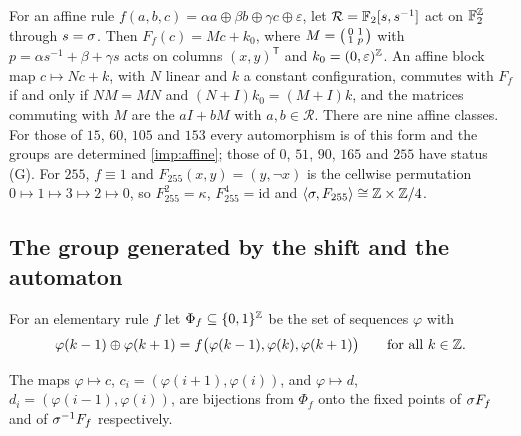 \begin{remark}\label{cl:rem:affine}
For an affine rule $f(a,b,c)=\alpha a\oplus\beta b\oplus\gamma c\oplus\varepsilon$, let $\mathcal R=\mathbb{F}_2[s,s^{-1}]$ act on $\mathbb{F}_2^{\mathbb{Z}}$ through $s=\sigma$. Then $F_f(c)=Mc+k_0$, where $M=\begin{psmallmatrix}0&1\\1&p\end{psmallmatrix}$ with $p=\alpha s^{-1}+\beta+\gamma s$ acts on columns $(x,y)^{\mathsf T}$ and $k_0=(0,\varepsilon)^{\mathbb{Z}}$. An affine block map $c\mapsto Nc+k$, with $N$ linear and $k$ a constant configuration, commutes with $F_f$ if and only if $NM=MN$ and $(N+I)k_0=(M+I)k$, and the matrices commuting with $M$ are the $aI+bM$ with $a,b\in\mathcal R$. There are nine affine classes. For those of $15$, $60$, $105$ and $153$ every automorphism is of this form and the groups are determined \eqref{imp:affine}; those of $0$, $51$, $90$, $165$ and $255$ have status (G). For $255$, $f\equiv1$ and $F_{255}(x,y)=(y,\neg x)$ is the cellwise permutation $0\mapsto1\mapsto3\mapsto2\mapsto0$, so $F_{255}^2=\kappa$, $F_{255}^4=\mathrm{id}$ and $\langle\sigma,F_{255}\rangle\cong\mathbb{Z}\times\mathbb{Z}/4$.
\end{remark}

\subsection{The group generated by the shift and the automaton}\label{cl:sec:Z2}

For an elementary rule $f$ let $\Phi_f\subseteq\{0,1\}^{\mathbb{Z}}$ be the set of sequences $\varphi$ with
\[
\varphi(k-1)\oplus\varphi(k+1)=f\bigl(\varphi(k-1),\varphi(k),\varphi(k+1)\bigr)\qquad\text{for all }k\in\mathbb{Z}.
\]

\begin{lemma}\label{cl:lem:Z2}
The maps $\varphi\mapsto c$, $c_i=(\varphi(i+1),\varphi(i))$, and $\varphi\mapsto d$, $d_i=(\varphi(i-1),\varphi(i))$, are bijections from $\Phi_f$ onto the fixed points of $\sigma F_f$ and of $\sigma^{-1}F_f$ respectively.
\end{lemma}

